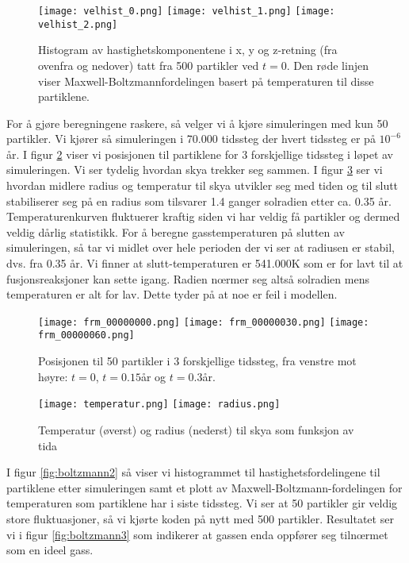 \documentclass[reprint,english,notitlepage]{revtex4-1}  %
\begin{document}
\begin{figure}[htbp]
\texttt{[image: velhist\_0.png]}
\texttt{[image: velhist\_1.png]}
\texttt{[image: velhist\_2.png]}
\caption{Histogram av hastighetskomponentene i x, y og z-retning (fra ovenfra og nedover) tatt fra 500 partikler ved $t=0$. Den røde linjen viser Maxwell-Boltzmannfordelingen basert på temperaturen til disse partiklene.\label{fig:boltzmann}} 
\end{figure}


For å gjøre beregningene raskere, så velger vi å kjøre simuleringen med kun 50 partikler. Vi kjører så simuleringen i 70.000 tidssteg der hvert tidssteg er på $10^{-6}$ år. I figur \ref{fig:particles} viser vi posisjonen til partiklene for 3 forskjellige tidssteg i løpet av simuleringen. Vi ser tydelig hvordan skya trekker seg sammen. I figur \ref{fig:radtemp} ser vi hvordan midlere radius og temperatur til skya utvikler seg med tiden og til slutt stabiliserer seg på en radius som tilsvarer 1.4 ganger solradien etter ca. 0.35 år. Temperaturenkurven fluktuerer kraftig siden vi har veldig få partikler og dermed veldig dårlig statistikk. For å beregne gasstemperaturen på slutten av simuleringen, så tar vi midlet over hele perioden der vi ser at radiusen er stabil, dvs. fra 0.35 år. Vi finner at slutt-temperaturen er 541.000K som er for lavt til at fusjonsreaksjoner kan sette igang. Radien nœrmer seg altså solradien mens temperaturen er alt for lav. Dette tyder på at noe er feil i modellen.

\begin{figure}[htbp]
\texttt{[image: frm\_00000000.png]}
\texttt{[image: frm\_00000030.png]}
\texttt{[image: frm\_00000060.png]}
\caption{Posisjonen til 50 partikler i 3 forskjellige tidssteg, fra venstre mot høyre: $t=0$, $t=0.15$år og $t=0.3$år. \label{fig:particles}} 
\end{figure}

\begin{figure}[htbp]
\texttt{[image: temperatur.png]}
\texttt{[image: radius.png]}
\caption{Temperatur (øverst) og radius (nederst) til skya som funksjon av tida \label{fig:radtemp}} 
\end{figure}

I figur \ref{fig:boltzmann2} så viser vi histogrammet til hastighetsfordelingene til partiklene etter simuleringen samt et plott av Maxwell-Boltzmann-fordelingen for temperaturen som partiklene har i siste tidssteg. Vi ser at 50 partikler gir veldig store fluktuasjoner, så vi kjørte koden på nytt med 500 partikler. Resultatet ser vi i figur \ref{fig:boltzmann3} som indikerer at gassen enda oppfører seg tilnœrmet som en ideel gass.
\end{document}
